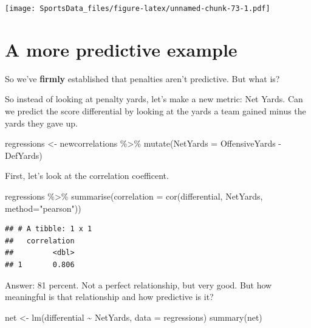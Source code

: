 \documentclass[
]{book}
\newenvironment{Shaded}{\begin{snugshade}}{\end{snugshade}}
\newcommand{\AttributeTok}[1]{\textcolor[rgb]{0.77,0.63,0.00}{#1}}
\newcommand{\FunctionTok}[1]{\textcolor[rgb]{0.00,0.00,0.00}{#1}}
\newcommand{\NormalTok}[1]{#1}
\newcommand{\OtherTok}[1]{\textcolor[rgb]{0.56,0.35,0.01}{#1}}
\newcommand{\SpecialCharTok}[1]{\textcolor[rgb]{0.00,0.00,0.00}{#1}}
\newcommand{\StringTok}[1]{\textcolor[rgb]{0.31,0.60,0.02}{#1}}
\begin{document}
\texttt{[image: SportsData\_files/figure-latex/unnamed-chunk-73-1.pdf]}

\hypertarget{a-more-predictive-example}{%
\section{A more predictive example}\label{a-more-predictive-example}}

So we've \textbf{firmly} established that penalties aren't predictive. But what is?

So instead of looking at penalty yards, let's make a new metric: Net Yards. Can we predict the score differential by looking at the yards a team gained minus the yards they gave up.

\begin{Shaded}
\begin{Highlighting}[]
\NormalTok{regressions }\OtherTok{\textless{}{-}}\NormalTok{ newcorrelations }\SpecialCharTok{\%\textgreater{}\%} \FunctionTok{mutate}\NormalTok{(}\AttributeTok{NetYards =}\NormalTok{ OffensiveYards }\SpecialCharTok{{-}}\NormalTok{ DefYards)}
\end{Highlighting}
\end{Shaded}

First, let's look at the correlation coefficent.

\begin{Shaded}
\begin{Highlighting}[]
\NormalTok{regressions }\SpecialCharTok{\%\textgreater{}\%} 
  \FunctionTok{summarise}\NormalTok{(}\AttributeTok{correlation =} \FunctionTok{cor}\NormalTok{(differential, NetYards, }\AttributeTok{method=}\StringTok{"pearson"}\NormalTok{))}
\end{Highlighting}
\end{Shaded}

\begin{verbatim}
## # A tibble: 1 x 1
##   correlation
##         <dbl>
## 1       0.806
\end{verbatim}

Answer: 81 percent. Not a perfect relationship, but very good. But how meaningful is that relationship and how predictive is it?

\begin{Shaded}
\begin{Highlighting}[]
\NormalTok{net }\OtherTok{\textless{}{-}} \FunctionTok{lm}\NormalTok{(differential }\SpecialCharTok{\textasciitilde{}}\NormalTok{ NetYards, }\AttributeTok{data =}\NormalTok{ regressions)}
\FunctionTok{summary}\NormalTok{(net)}
\end{Highlighting}
\end{Shaded}
\end{document}
